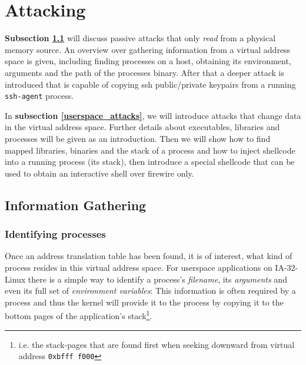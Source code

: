 %
%

\section{Attacking}

\label{attacks}

\textbf{Subsection \ref{information_gathering}} will discuss passive attacks
that only \emph{read} from a physical memory source. An overview over gathering
information from a virtual address space is given, including finding processes
on a host, obtaining its environment, arguments and the path of the processes
binary. After that a deeper attack is introduced that is capable of copying ssh
public/private keypairs from a running \texttt{ssh-agent} process.

In \textbf{subsection \ref{userspace_attacks}}, we will introduce attacks that
change data in the virtual address space. Further details about executables,
libraries and processes will be given as an introduction. Then we will show how
to find mapped libraries, binaries and the stack of a process and how to inject
shellcode into a running process (its stack), then introduce a special shellcode
that can be used to obtain an interactive shell over firewire only.



\subsection{Information Gathering}

\label{information_gathering}

\subsubsection{Identifying processes}

\label{identifying_processes} Once an address translation table has been found,
it is of interest, what kind of process resides in this virtual address space.
For userspace applications on IA-32-Linux there is a simple way to identify a
process's \emph{filename}, its \emph{arguments} and even its full set of
\emph{environment variables}: This information is often required by a process
and thus the kernel will provide it to the process by copying it to the bottom
pages of the application's stack\footnote{i.e\@. the stack-pages that are found
first when seeking downward from virtual address \texttt{0xbfff~f000}}.

